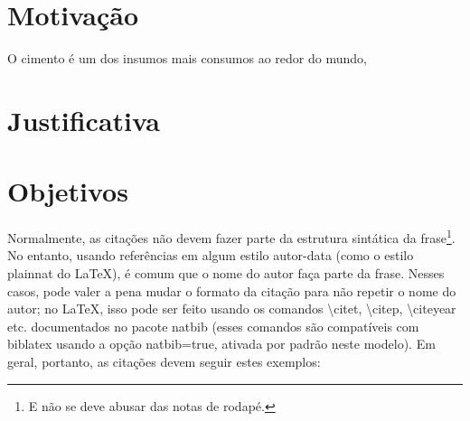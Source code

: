 

\label{cap:introducao}

\enlargethispage{.5\baselineskip}

\section*{Motivação}

O cimento é um dos insumos mais consumos ao redor do mundo,
\section*{Justificativa}
\section*{Objetivos}


\label{sec:consideracoes_preliminares}

Normalmente, as citações não devem fazer parte da estrutura sintática da
frase\footnote{E não se deve abusar das notas de rodapé.}.
No entanto, usando referências em algum estilo autor-data (como o estilo
plainnat do \LaTeX{}), é comum que o nome do autor faça parte da frase. Nesses
casos, pode valer a pena mudar o formato da citação para não repetir o nome do
autor; no \LaTeX{}, isso pode ser feito usando os comandos
\textsf{\textbackslash{}citet}, \textsf{\textbackslash{}citep},
\textsf{\textbackslash{}citeyear} etc. documentados no pacote
natbib \citep{natbib} (esses comandos são compatíveis com biblatex
usando a opção \textsf{natbib=true}, ativada por padrão neste modelo). Em geral,
portanto, as citações devem seguir estes exemplos:

